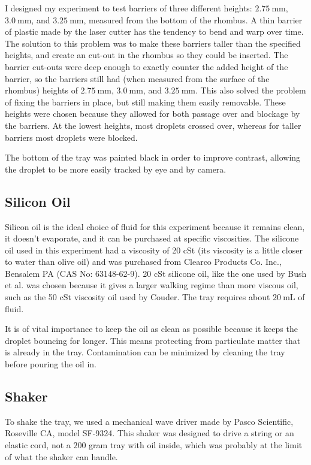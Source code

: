 I designed my experiment to test barriers of three different heights: $2.75~\mathrm{mm}$, $3.0~\mathrm{mm}$, and $3.25~\mathrm{mm}$, measured from the bottom of the rhombus. A thin barrier of plastic made by the laser cutter has the tendency to bend and warp over time. The solution to this problem was to make these barriers taller than the specified heights, and create an cut-out in the rhombus so they could be inserted. The barrier cut-outs were deep enough to exactly counter the added height of the barrier, so the barriers still had (when measured from the surface of the rhombus) heights of $2.75~\mathrm{mm}$, $3.0~\mathrm{mm}$, and $3.25~\mathrm{mm}$. This also solved the problem of fixing the barriers in place, but still making them easily removable. These heights were chosen because they allowed for both passage over and blockage by the barriers. At the lowest heights, most droplets crossed over, whereas for taller barriers most droplets were blocked. 


The bottom of the tray was painted black in order to improve contrast, allowing the droplet to be more easily tracked by eye and by camera.

\subsection{Silicon Oil}
    Silicon oil is the ideal choice of fluid for this experiment because it remains clean, it doesn't evaporate, and it can be purchased at specific viscosities. The silicone oil used in this experiment had a viscosity of 20 cSt (its viscosity is a little closer to water than olive oil) and was purchased from Clearco Products Co. Inc., Bensalem PA (CAS No: 63148-62-9). 20 cSt silicone oil, like the one used by Bush et al. was chosen because it gives a larger walking regime than more viscous oil, such as the 50 cSt viscosity oil used by Couder. The tray requires about $20~\mathrm{mL}$ of fluid.
    
    It is of vital importance to keep the oil as clean as possible because it keeps the droplet bouncing for longer. This means protecting from particulate matter that is already in the tray. Contamination can be minimized by cleaning the tray before pouring the oil in.
    
\subsection{Shaker}
    To shake the tray, we used a mechanical wave driver made by Pasco Scientific, Roseville CA, model SF-9324. This shaker was designed to drive a string or an elastic cord, not a $200$ gram tray with oil inside, which was probably at the limit of what the shaker can handle. 

